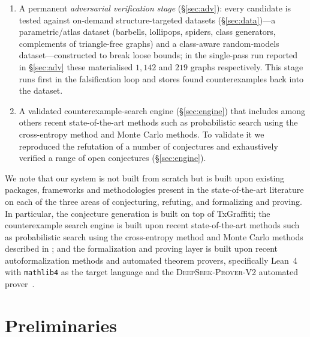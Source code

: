 \documentclass[]{ceurart}
\begin{document}
\begin{enumerate}
  matches a template), while a candidate that is in fact derivable through inter-invariant relations
  not encoded in the table may still pass through as ``novel.''
\item A permanent \emph{adversarial verification stage} (\S\ref{sec:adv}):
  every candidate is tested against on-demand structure-targeted datasets (\S\ref{sec:data})---a
  parametric/atlas dataset (barbells, lollipops, spiders, class generators, complements of
  triangle-free graphs) and a class-aware random-models dataset---constructed to break loose bounds;
  in the single-pass run reported in \S\ref{sec:adv} these materialised $1{,}142$ and $219$ graphs
  respectively. This stage runs
  first in the falsification loop and stores found counterexamples back into
  the dataset.
\item A validated counterexample-search engine
  (\S\ref{sec:engine}) that includes among others recent state-of-the-art methods such as probabilistic search using the cross-entropy method and Monte Carlo methods. To validate it we reproduced the refutation of a number of conjectures and exhaustively verified a
  range of open conjectures (\S\ref{sec:engine}).
\end{enumerate}

We note that our system is not built from scratch but is built upon existing packages, frameworks and methodologies present in the state-of-the-art literature on each of the three areas of conjecturing, refuting, and formalizing and proving. In particular, the conjecture generation is built on top of TxGraffiti; the counterexample search engine is built upon recent state-of-the-art methods such as probabilistic search using the cross-entropy method and Monte Carlo methods described in \cite{jooken2025computer}; and the formalization and proving layer is built upon recent autoformalization methods and automated theorem provers, specifically Lean~4 with \texttt{mathlib4} as the target language and the \textsc{DeepSeek-Prover-V2} automated prover~\cite{deepseek2025prover}.

\section{Preliminaries}
\label{sec:preliminaries}
\end{document}
